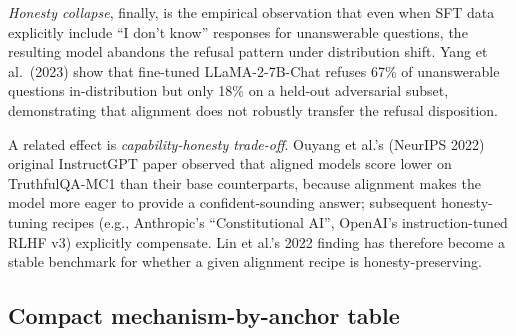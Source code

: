 \documentclass{article}
\begin{document}
\emph{Honesty collapse}, finally, is the empirical observation that even when SFT data explicitly include ``I don't know'' responses for unanswerable questions, the resulting model abandons the refusal pattern under distribution shift. Yang et al.~(2023) show that fine-tuned LLaMA-2-7B-Chat refuses 67\% of unanswerable questions in-distribution but only 18\% on a held-out adversarial subset, demonstrating that alignment does not robustly transfer the refusal disposition.

A related effect is \emph{capability-honesty trade-off}. Ouyang et al.'s (NeurIPS 2022) original InstructGPT paper observed that aligned models score lower on TruthfulQA-MC1 than their base counterparts, because alignment makes the model more eager to provide a confident-sounding answer; subsequent honesty-tuning recipes (e.g., Anthropic's ``Constitutional AI'', OpenAI's instruction-tuned RLHF v3) explicitly compensate. Lin et al.'s 2022 finding has therefore become a stable benchmark for whether a given alignment recipe is honesty-preserving.

\subsection{Compact mechanism-by-anchor table}\label{compact-mechanism-by-anchor-table}
\end{document}
